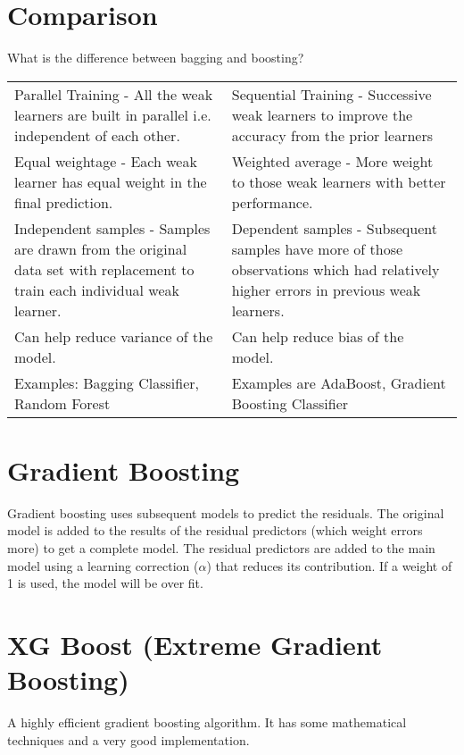 	\section{Comparison}
What is the difference between bagging and boosting?

	\begin{topcaptiontable}
        \centering
        \lecaption{}
        \label{tab:}
		\begin{tabular}{|p{}|p{}|} \hline
			\tablecolumnheadervlinesone{Bagging} & \tablecolumnheadervlinestwo{Boosting} \\ \hline
			Parallel Training - All the weak learners are built in parallel i.e. independent of each other. &
			Sequential Training - Successive weak learners to improve the accuracy from the prior learners \\ \hline
			Equal weightage - Each weak learner has equal weight in the final prediction. &
			Weighted average - More weight to those weak learners with better performance. \\ \hline
			Independent samples - Samples are drawn from the original data set with replacement to train each individual weak learner. &
			Dependent samples - Subsequent samples have more of those observations which had relatively higher errors in previous weak learners. \\ \hline
			Can help reduce variance of the model. &
			Can help reduce bias of the model. \\ \hline
			Examples: Bagging Classifier, Random Forest &
			Examples are AdaBoost, Gradient Boosting Classifier \\ \hline
		\end{tabular}
	\end{topcaptiontable}

	\section{Gradient Boosting}
Gradient boosting uses subsequent models to predict the residuals.  The original model is added to the results of the residual predictors (which weight errors more) to get a complete model.  The residual predictors are added to the main model using a learning correction ($\alpha$) that reduces its contribution.  If a weight of 1 is used, the model will be over fit.

	\section{XG Boost (Extreme Gradient Boosting)}
A highly efficient gradient boosting algorithm.  It has some mathematical techniques and a very good implementation.

